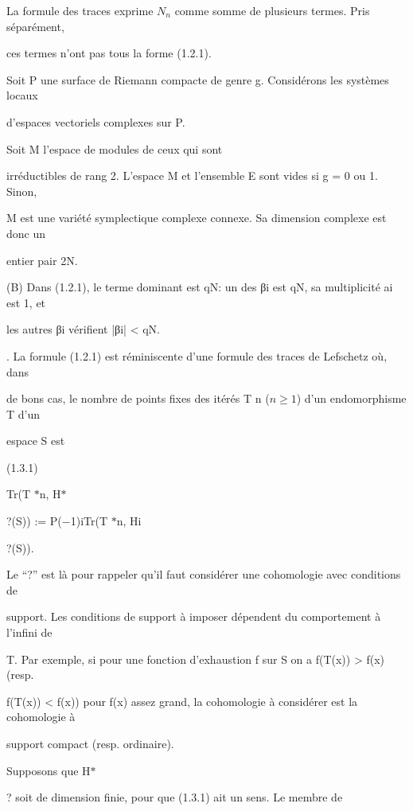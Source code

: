 \documentclass[11pt]{article}
\begin{document}
\noindent La formule des traces exprime \(N_n\) comme somme de plusieurs termes. Pris séparément,\par
\noindent ces termes n’ont pas tous la forme (1.2.1).\par
\noindent Soit P une surface de Riemann compacte de genre g. Considérons les systèmes locaux\par
\noindent d’espaces vectoriels complexes sur P.\par
\noindent Soit M l’espace de modules de ceux qui sont\par
\noindent irréductibles de rang 2. L’espace M et l’ensemble E sont vides si g = 0 ou 1. Sinon,\par
\noindent M est une variété symplectique complexe connexe. Sa dimension complexe est donc un\par
\noindent entier pair 2N.\par
\noindent (B) Dans (1.2.1), le terme dominant est qN: un des βi est qN, sa multiplicité ai est 1, et\par
\noindent les autres βi vérifient |βi| < qN.\par
{}. La formule (1.2.1) est réminiscente d’une formule des traces de Lefschetz où, dans\par
\noindent de bons cas, le nombre de points fixes des itérés T n (\(n\geq 1\)) d’un endomorphisme T d’un\par
\noindent espace S est\par
\noindent (1.3.1)\par
\noindent Tr(T \(*\)n, H\(*\)\par
\noindent ?(S)) := P(−1)iTr(T \(*\)n, Hi\par
\noindent ?(S)).\par
\medskip
\noindent Le “?” est là pour rappeler qu’il faut considérer une cohomologie avec conditions de\par
\noindent support. Les conditions de support à imposer dépendent du comportement à l’infini de\par
\noindent T. Par exemple, si pour une fonction d’exhaustion f sur S on a f(T(x)) > f(x) (resp.\par
\noindent f(T(x)) < f(x)) pour f(x) assez grand, la cohomologie à considérer est la cohomologie à\par
\noindent support compact (resp. ordinaire).\par
\noindent Supposons que H\(*\)\par
\noindent ? soit de dimension finie, pour que (1.3.1) ait un sens. Le membre de\par
\end{document}
